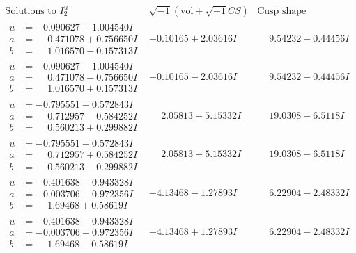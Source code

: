 \documentclass[1p]{elsarticle_modified}
\theoremstyle{definition}
\newcommand{\I}{\sqrt{-1}}
\begin{document}
$$\begin{array}{c|c|c}  
\text{Solutions to }I^u_{2}& \I (\text{vol} + \sqrt{-1}CS) & \text{Cusp shape}\\
 \hline 
\begin{aligned}
u &= -0.090627 + 1.004540 I \\
a &= \phantom{-}0.471078 + 0.756650 I \\
b &= \phantom{-}1.016570 - 0.157313 I\end{aligned}
 & -0.10165 + 2.03616 I & \phantom{-}9.54232 - 0.44456 I \\ \hline\begin{aligned}
u &= -0.090627 - 1.004540 I \\
a &= \phantom{-}0.471078 - 0.756650 I \\
b &= \phantom{-}1.016570 + 0.157313 I\end{aligned}
 & -0.10165 - 2.03616 I & \phantom{-}9.54232 + 0.44456 I \\ \hline\begin{aligned}
u &= -0.795551 + 0.572843 I \\
a &= \phantom{-}0.712957 - 0.584252 I \\
b &= \phantom{-}0.560213 + 0.299882 I\end{aligned}
 & \phantom{-}2.05813 - 5.15332 I & \phantom{-}19.0308 + 6.5118 I \\ \hline\begin{aligned}
u &= -0.795551 - 0.572843 I \\
a &= \phantom{-}0.712957 + 0.584252 I \\
b &= \phantom{-}0.560213 - 0.299882 I\end{aligned}
 & \phantom{-}2.05813 + 5.15332 I & \phantom{-}19.0308 - 6.5118 I \\ \hline\begin{aligned}
u &= -0.401638 + 0.943328 I \\
a &= -0.003706 - 0.972356 I \\
b &= \phantom{-}1.69468 + 0.58619 I\end{aligned}
 & -4.13468 - 1.27893 I & \phantom{-}6.22904 + 2.48332 I \\ \hline\begin{aligned}
u &= -0.401638 - 0.943328 I \\
a &= -0.003706 + 0.972356 I \\
b &= \phantom{-}1.69468 - 0.58619 I\end{aligned}
 & -4.13468 + 1.27893 I & \phantom{-}6.22904 - 2.48332 I \\ \hline\begin{aligned}

\end{aligned}
\end{array}$$
\end{document}
